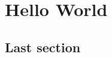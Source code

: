 \documentclass{book}
\begin{document}
\frontmatter
  \tableofcontents
\mainmatter
  \chapter{Hello World}
  \clearpage
  \section{Last section}
\end{document}
